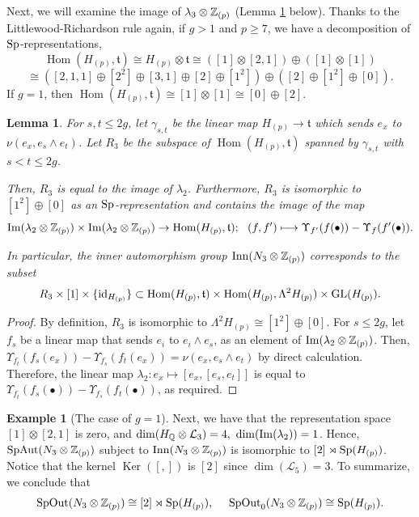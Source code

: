 \documentclass{article}
\theoremstyle{plain}
\newtheorem{lem}[thm]{Lemma}
\theoremstyle{definition}
\newtheorem{exa}[thm]{Example}
\def\dim{\mathop{\mathrm{dim}}\nolimits}
\def\Im{\mathop{\mathrm{Im}}\nolimits}
\def\Qer{\mathop{\mathrm{Ker}}\nolimits}
\def\Hom{\mathop{\mathrm{Hom}}\nolimits}
\newcommand{\ra}{\rightarrow}
\newcommand{\Q}{{\Bbb Q}}
\newcommand{\Z}{{\Bbb Z}}
\newcommand{\Sp}{{\rm Sp}}
\newcommand{\GL}{{\rm GL}}
\newcommand{\SpAut}{{\rm SpAut}}
\newcommand{\SpOut}{{\rm SpOut}}
\begin{document}
{Next, we will examine the image of $\lambda_3 \otimes \Z_{(p)} $ (Lemma \ref{lem491} below). Thanks to the Littlewood-Richardson rule again, if $g>1$ and $p \geq 7$, we have a decomposition of $\Sp$-representations,
\[ \Hom( H_{(p)}, \mathfrak{t} ) \cong H_{(p)} \otimes \mathfrak{t}
\cong ([1] \otimes [2, 1]) \oplus ( [1] \otimes [1] ) \]
\begin{equation}\label{ppo}\cong ( [2, 1, 1] \oplus [2^2] \oplus [3,1] \oplus [2]\oplus [1^2]) \oplus ( [2] \oplus [1^2] \oplus [0] ). \end{equation}
If $g=1$, then $\Hom( H_{(p)}, \mathfrak{t} ) \cong [1] \otimes [1] \cong [0] \oplus [2]. $

\begin{lem}\label{lem491}
For $s,t \leq 2g$, let $\gamma_{s,t}$ be the linear map $ H_{(p)} \ra \mathfrak{t} $ which sends $e_x$ to $\nu( e_x, e_s \wedge e_t)$. Let $R_3$ be the subspace of $\Hom( H_{(p)}, \mathfrak{t})$ spanned by $\gamma_{s,t}$ with $s<t \leq 2g$.

Then, $ R_3$ is equal to the image of $ \lambda_2$. Furthermore, $ R_3$ is isomorphic to $[1^2]\oplus [0]$ as an $\Sp$-representation and contains the image of the map
\[\Im ( \lambda_2 \otimes \Z_{(p)} ) \times \Im ( \lambda_2 \otimes \Z_{(p)} ) \ra \Hom(H_{(p)}, \mathfrak{t}) ; \ \ (f,f') \longmapsto \Upsilon_{f'}(f( \bullet))- \Upsilon_{f}(f'( \bullet)). \]

In particular, the inner automorphism group $ \mathrm{Inn}(N_3 \otimes \Z_{(p)})$ corresponds to the subset
\[ R_3 \times [1] \times \{ \mathrm{id}_{H_{(p)}} \} \subset \Hom( H_{(p)}, \mathfrak{t} ) \times \Hom( H_{(p)}, \Lambda^2 H_{(p)}) \times \GL(H_{(p)}).\]
\end{lem}

\begin{proof}
By definition, $R_3$ is isomorphic to $\Lambda^2 H_{(p)} \cong [1^2]\oplus [0]$. For $s \leq 2g$, let $f_s$ be a linear map that sends $e_i$ to $e_i \wedge e_s$, as an element of $\Im ( \lambda_2 \otimes \Z_{(p)} ) $. Then, $ \Upsilon_{f_t} (f_s(e_x)) - \Upsilon_{f_s} (f_t(e_x))= \nu ( e_x, e_s \wedge e_t) $ by direct calculation. Therefore, the linear map $\lambda_2: e_x \mapsto [e_x, [e_s,e_t]]$ is equal to $ \Upsilon_{f_t} (f_s(\bullet)) - \Upsilon_{f_s} (f_t(\bullet))$, as required.
\end{proof}

\begin{exa}
[{The case of $g=1$}]\label{ex14k} Next, we have that the representation space $[1] \otimes [2, 1 ] $ is zero, and $\dim (H_{\Q } \otimes \mathcal{L}_3 ) =4, \ \dim (\Im ( \lambda_2) ) =1$. Hence, $\SpAut( N_3 \otimes \Z_{(p)})$ subject to $ \mathrm{Inn}(N_3 \otimes \Z_{(p)} ) $ is isomorphic to $ [2] \rtimes \Sp(H_{(p)})$. Notice that the kernel $\Qer([,])$ is $[2]$ since $\dim (\mathcal{L}_5 ) =3 $. To summarize, we conclude that
\begin{equation}\label{44} \SpOut(N_3 \otimes \Z_{(p)}) \cong [2] \rtimes \Sp(H_{(p)} ), \ \ \ \ \SpOut_0(N_3 \otimes \Z_{(p)}) \cong \Sp(H_{(p)} ). \notag \end{equation}


\end{exa}}
\end{document}
